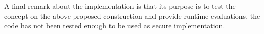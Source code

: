 A final remark about the implementation is that its purpose is to test the concept on the above proposed construction and provide runtime evaluations, the code has not been tested enough to be used as secure implementation.



